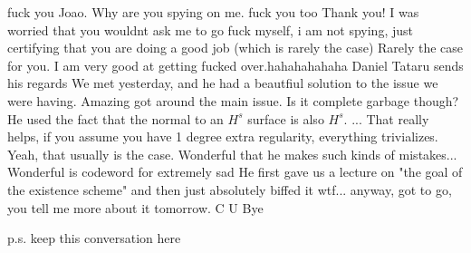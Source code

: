\documentclass[12pt,leqno]{amsart}
\numberwithin{equation}{section}
\theoremstyle{plain}
\theoremstyle{definition}
\begin{document}


fuck you Joao. Why are you spying on me. fuck you too
Thank you! I was worried that you wouldnt ask me to go fuck myself, i am not spying, just certifying that you are doing a good job (which is rarely the case)  Rarely the case for you. I am very good at getting fucked over.hahahahahaha Daniel Tataru sends his regards 
We met yesterday, and he had a beautfiul solution to the issue we were having. Amazing got around the main issue.
Is it complete garbage though? 
He used the fact that the normal to an $H^s$ surface is also $H^s$. ... That really helps, if you assume you have 1 degree extra regularity, everything trivializes. Yeah, that usually is the case. Wonderful that he makes such kinds of mistakes... Wonderful is codeword for extremely sad 
He first gave us a lecture on "the goal of the existence scheme"
and then just absolutely biffed it
wtf... 
anyway, got to go, you tell me more about it tomorrow. C U Bye

p.s. keep this conversation here 
\end{document}
